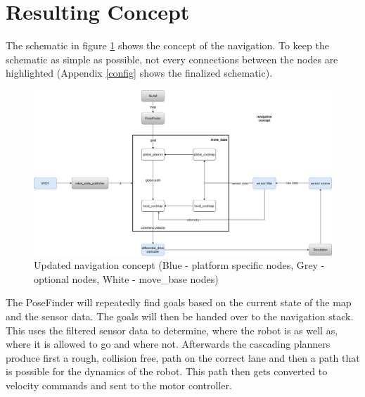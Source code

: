 \section{Resulting Concept}
The schematic in figure \ref{navconcept} shows the concept of the navigation.  To keep the schematic as simple as possible, not every connections between the nodes are highlighted (Appendix \ref{config} shows the finalized schematic).\\

\begin{figure}[H]
	\begin{center}
		\includegraphics[width=140mm]{Pictures/Updated navigation concept}
		\caption[Updated navigation concept]{Updated navigation concept (Blue - platform specific nodes, Grey - optional nodes, White - move\_base nodes)}
		\label{navconcept}
	\end{center}
\end{figure}



The PoseFinder will repeatedly find goals based on the current state of the map and the sensor data. The goals will then be handed over to the navigation stack. This uses the filtered sensor data to determine, where the robot is as well as, where it is allowed to go and where not. Afterwards the cascading planners produce first a rough, collision free, path on the correct lane and then a path that is possible for the dynamics of the robot. This path then gets converted to velocity commands and sent to the motor controller.\\




